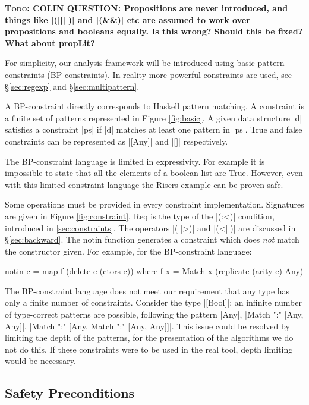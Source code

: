 \documentclass[preprint]{sigplanconf}
\newcommand{\C}[1]{\textsf{#1}}
\newcommand{\todo}[1]{\textbf{\textsc{Todo:} #1}}
\begin{document}
\todo{COLIN QUESTION: Propositions are never introduced, and things like |(||||)| and |(&&)| etc are assumed to work over propositions and booleans equally. Is this wrong? Should this be fixed? What about \C{propLit}?}

For simplicity, our analysis framework will be introduced using basic pattern constraints (BP-constraints). In  reality more powerful constraints are used, see \S\ref{sec:regexp} and \S\ref{sec:multipattern}.
 
A BP-constraint directly corresponds to Haskell pattern matching. A constraint is a finite set of patterns represented in Figure \ref{fig:basic}. A given data structure |d| satisfies a constraint |ps| if |d| matches at least one pattern in |ps|. True and false constraints can be represented as |[Any]| and |[]| respectively.

The BP-constraint language is limited in expressivity. For example it is impossible to state that all the elements of a boolean list are True. However, even with this limited constraint language the Risers example can be proven safe.

Some operations must be provided in every constraint implementation. Signatures are given in Figure \ref{fig:constraint}. \C{Req} is the type of the |(:<)| condition, introduced in \ref{sec:constraints}. The operators |(||>)| and |(<||)| are discussed in \S\ref{sec:backward}. The \C{notin} function generates a constraint which does \textit{not} match the constructor given. For example, for the BP-constraint language:

\begin{code}
notin c = map f (delete c (ctors c))
   where f x = Match x (replicate (arity c) Any)
\end{code}

The BP-constraint language does not meet our requirement that any type has only a finite number of constraints. Consider the type |[Bool]|: an infinite number of type-correct patterns are possible, following the pattern |Any|, |Match ":" [Any, Any]|, |Match ":" [Any, Match ":" [Any, Any]]|. This issue could be resolved by limiting the depth of the patterns, for the presentation of the algorithms we do not do this. If these constraints were to be used in the real tool, depth limiting would be necessary.

\subsection{Safety Preconditions}
\label{sec:precond}
\end{document}
